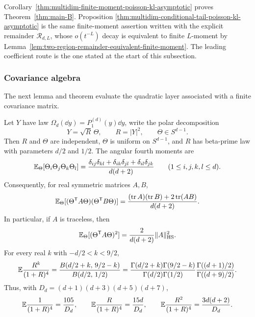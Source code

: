 \begin{remark}
Corollary~\ref{thm:multidim-finite-moment-poisson-kl-asymptotic} proves
Theorem~\ref{thm:main-B}.  Proposition
\ref{thm:multidim-conditional-tail-poisson-kl-asymptotic} is the same
finite-moment assertion written with the explicit remainder
\(\mathcal R_{d,L}\), whose \(o(t^{-L})\) decay is equivalent to finite
\(L\)-moment by
Lemma~\ref{lem:two-region-remainder-equivalent-finite-moment}.  The leading
coefficient route is the one stated at the start of this subsection.
\end{remark}
\fi

\subsubsection*{Covariance algebra}\leavevmode\par\smallskip

The next lemma and theorem evaluate the quadratic layer associated with a
finite covariance matrix.

\begin{lemma}%
\label{lem:radial-angular-contractions}
Let \(Y\) have law
\(\Omega_d(\dd y)=P_1^{(d)}(y)\dd y\), write the polar decomposition
\[
Y=\sqrt R\,\Theta,\qquad R=|Y|^2,\qquad \Theta\in S^{d-1}.
\]
Then \(R\) and \(\Theta\) are independent, \(\Theta\) is uniform on
\(S^{d-1}\), and \(R\) has beta-prime law with parameters \(d/2\) and
\(1/2\).  The angular fourth moments are
\begin{equation}\label{eq:spherical-fourth-contraction}
\mathbb{E}_\Theta[\Theta_i\Theta_j\Theta_k\Theta_l]
=
\frac{\delta_{ij}\delta_{kl}
+\delta_{ik}\delta_{jl}
+\delta_{il}\delta_{jk}}{d(d+2)}
\qquad(1\le i,j,k,l\le d).
\end{equation}
Consequently, for real symmetric matrices \(A,B\),
\begin{equation}\label{eq:spherical-quadratic-contraction}
\mathbb{E}_\Theta[
(\Theta^{\mathsf T}A\Theta)(\Theta^{\mathsf T}B\Theta)]
=
\frac{(\operatorname{tr}A)(\operatorname{tr}B)
+2\operatorname{tr}(AB)}{d(d+2)}.
\end{equation}
In particular, if \(A\) is traceless, then
\begin{equation}\label{eq:spherical-traceless-square}
\mathbb{E}_\Theta[(\Theta^{\mathsf T}A\Theta)^2]
=\frac{2}{d(d+2)}\|A\|_{\rm HS}^2 .
\end{equation}
For every real \(k\) with \(-d/2<k<9/2\),
\begin{equation}\label{eq:radial-beta-prime-contraction-general}
\mathbb{E}\frac{R^k}{(1+R)^4}
=
\frac{B(d/2+k,\,9/2-k)}{B(d/2,\,1/2)}
=
\frac{\Gamma(d/2+k)\Gamma(9/2-k)}
{\Gamma(d/2)\Gamma(1/2)}
\frac{\Gamma((d+1)/2)}{\Gamma((d+9)/2)} .
\end{equation}
Thus, with \(D_d=(d+1)(d+3)(d+5)(d+7)\),
\begin{equation}\label{eq:radial-beta-prime-contractions-low}
\mathbb{E}\frac{1}{(1+R)^4}=\frac{105}{D_d},\qquad
\mathbb{E}\frac{R}{(1+R)^4}=\frac{15d}{D_d},\qquad
\mathbb{E}\frac{R^2}{(1+R)^4}=\frac{3d(d+2)}{D_d}.
\end{equation}
\end{lemma}

